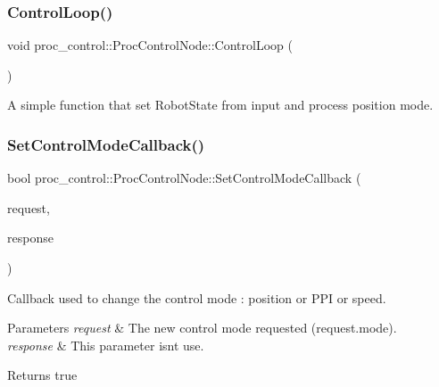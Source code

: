 \subsubsection{\texorpdfstring{Control\+Loop()}{ControlLoop()}}
{\footnotesize\ttfamily void proc\+\_\+control\+::\+Proc\+Control\+Node\+::\+Control\+Loop (\begin{DoxyParamCaption}{ }\end{DoxyParamCaption})}

A simple function that set Robot\+State from input and process position mode. \mbox{\label{classproc__control_1_1_proc_control_node_ac56aa1e6e028c225be157371aba76d32}} 
\subsubsection{\texorpdfstring{Set\+Control\+Mode\+Callback()}{SetControlModeCallback()}}
{\footnotesize\ttfamily bool proc\+\_\+control\+::\+Proc\+Control\+Node\+::\+Set\+Control\+Mode\+Callback (\begin{DoxyParamCaption}\item[{proc\+\_\+control\+::\+Set\+Control\+Mode\+Request \&}]{request,  }\item[{proc\+\_\+control\+::\+Set\+Control\+Mode\+Response \&}]{response }\end{DoxyParamCaption})}

Callback used to change the control mode \+: position or P\+PI or speed. 
\begin{DoxyParams}{Parameters}
{\em request} & The new control mode requested (request.\+mode). \\
\hline
{\em response} & This parameter isn\textquotesingle{}t use. \\
\hline
\end{DoxyParams}
\begin{DoxyReturn}{Returns}
true 
\end{DoxyReturn}
\mbox{\label{classproc__control_1_1_proc_control_node_a7890db7144358d5aaf0daa7bfefed964}} 
